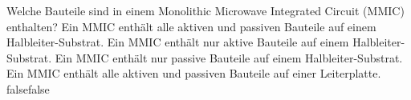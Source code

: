     {Welche Bauteile sind in einem Monolithic Microwave Integrated Circuit (MMIC) enthalten?}
    {Ein MMIC enthält alle aktiven und passiven Bauteile auf einem Halbleiter-Substrat.}
    {Ein MMIC enthält nur aktive Bauteile auf einem Halbleiter-Substrat.}
    {Ein MMIC enthält nur passive Bauteile auf einem Halbleiter-Substrat.}
    {Ein MMIC enthält alle aktiven und passiven Bauteile auf einer Leiterplatte.}
    {false}{false}